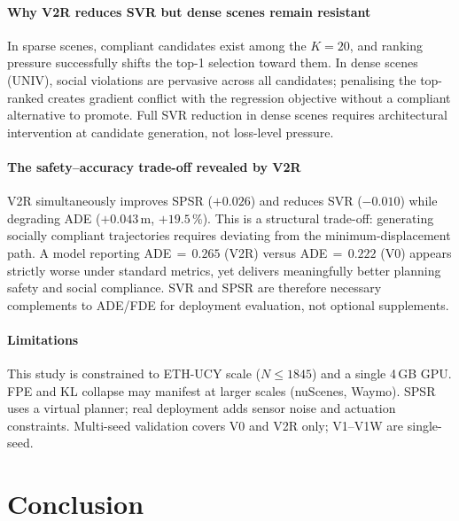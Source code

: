\documentclass[journal,letterpaper]{IEEEtran}
\begin{document}
\paragraph{Why V2R reduces SVR but dense scenes remain resistant}
In sparse scenes, compliant candidates exist among the $K{=}20$,
and ranking pressure successfully shifts the top-1 selection toward
them.
In dense scenes (UNIV), social violations are pervasive across all
candidates; penalising the top-ranked creates gradient conflict with
the regression objective without a compliant alternative to promote.
Full SVR reduction in dense scenes requires architectural intervention
at candidate generation, not loss-level pressure.

\paragraph{The safety--accuracy trade-off revealed by V2R}
V2R simultaneously improves SPSR ($+0.026$) and reduces SVR ($-0.010$)
while degrading ADE ($+0.043$\,m, $+19.5\,\%$).
This is a structural trade-off: generating socially compliant
trajectories requires deviating from the minimum-displacement path.
A model reporting ADE\,\(=\,0.265\) (V2R) versus ADE\,\(=\,0.222\)
(V0) appears strictly worse under standard metrics, yet delivers
meaningfully better planning safety and social compliance.
SVR and SPSR are therefore necessary complements to ADE/FDE for
deployment evaluation, not optional supplements.

\paragraph{Limitations}
This study is constrained to ETH-UCY scale ($N\leq1845$) and a
single 4\,GB GPU.
FPE and KL collapse may manifest at larger scales (nuScenes, Waymo).
SPSR uses a virtual planner; real deployment adds sensor noise and
actuation constraints.
Multi-seed validation covers V0 and V2R only; V1--V1W are single-seed.

\section{Conclusion}
\label{sec:conclusion}
\end{document}
